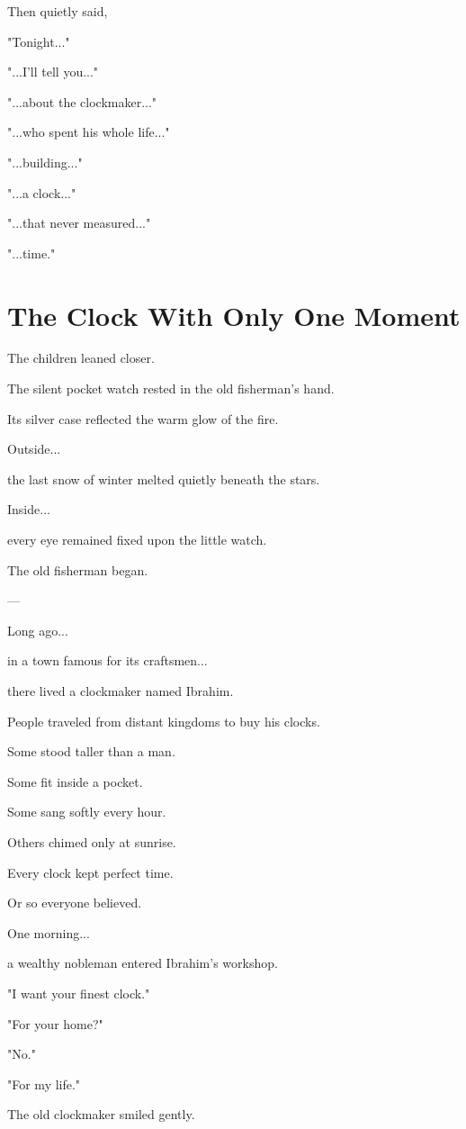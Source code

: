 \documentclass[12pt,openany]{book}
\begin{document}
Then quietly said,

"Tonight..."

"...I'll tell you..."

"...about the clockmaker..."

"...who spent his whole life..."

"...building..."

"...a clock..."

"...that never measured..."

"...time."
\section*{The Clock With Only One Moment}

The children leaned closer.

The silent pocket watch rested in the old fisherman's hand.

Its silver case reflected the warm glow of the fire.

Outside...

the last snow of winter melted quietly beneath the stars.

Inside...

every eye remained fixed upon the little watch.

The old fisherman began.

---

Long ago...

in a town famous for its craftsmen...

there lived a clockmaker named Ibrahim.

People traveled from distant kingdoms to buy his clocks.

Some stood taller than a man.

Some fit inside a pocket.

Some sang softly every hour.

Others chimed only at sunrise.

Every clock kept perfect time.

Or so everyone believed.

One morning...

a wealthy nobleman entered Ibrahim's workshop.

"I want your finest clock."

"For your home?"

"No."

"For my life."

The old clockmaker smiled gently.
\end{document}
